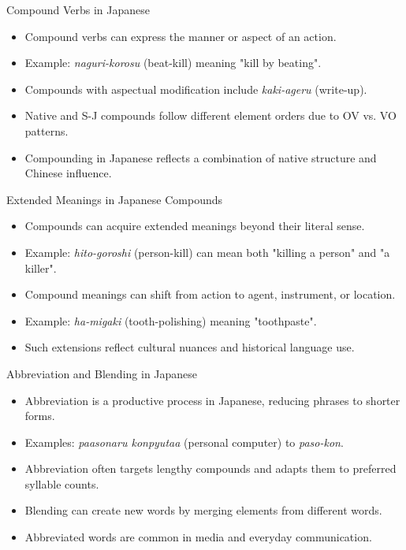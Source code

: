 \documentclass{beamer}
\begin{document}
\begin{frame}{Compound Verbs in Japanese}
    \begin{itemize}
        \item Compound verbs can express the manner or aspect of an action.
        \item Example: \textit{naguri-korosu} (beat-kill) meaning "kill by beating".
        \item Compounds with aspectual modification include \textit{kaki-ageru} (write-up).
        \item Native and S-J compounds follow different element orders due to OV vs. VO patterns.
        \item Compounding in Japanese reflects a combination of native structure and Chinese influence.
    \end{itemize}
\end{frame}

\begin{frame}{Extended Meanings in Japanese Compounds}
    \begin{itemize}
        \item Compounds can acquire extended meanings beyond their literal sense.
        \item Example: \textit{hito-goroshi} (person-kill) can mean both "killing a person" and "a killer".
        \item Compound meanings can shift from action to agent, instrument, or location.
        \item Example: \textit{ha-migaki} (tooth-polishing) meaning "toothpaste".
        \item Such extensions reflect cultural nuances and historical language use.
    \end{itemize}
\end{frame}

\begin{frame}{Abbreviation and Blending in Japanese}
    \begin{itemize}
        \item Abbreviation is a productive process in Japanese, reducing phrases to shorter forms.
        \item Examples: \textit{paasonaru konpyutaa} (personal computer) to \textit{paso-kon}.
        \item Abbreviation often targets lengthy compounds and adapts them to preferred syllable counts.
        \item Blending can create new words by merging elements from different words.
        \item Abbreviated words are common in media and everyday communication.
    \end{itemize}
\end{frame}
\end{document}
